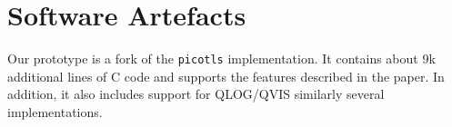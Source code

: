 %


\section*{Software Artefacts}

Our \tcpls prototype is a fork of the \texttt{picotls}  implementation. 
It contains about 9k additional lines of C code and supports the features 
described in the paper. In addition, it also includes support for QLOG/QVIS 
\cite{marx2020debugging} similarly several \quic implementations. 
\newpage


